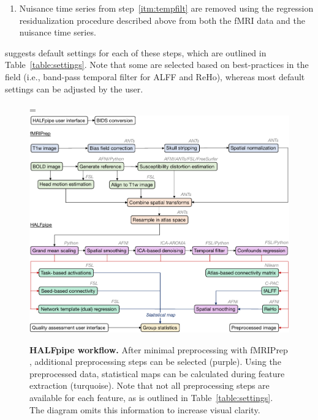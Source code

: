 \begin{enumerate}[leftmargin=*]
\item

Nuisance time series from step~\ref{itm:tempfilt} are removed using the
regression residualization procedure described above from both the fMRI
data and the nuisance time series.

\end{enumerate}

 suggests default settings for each of these steps, which
are outlined in Table~\ref{table:settings}. Note that some are selected based on
best-practices in the field (i.e., band-pass temporal filter for ALFF and
ReHo), whereas most default settings can be adjusted by the user.

\begin{figure}[!tb]
\begin{adjustwidth}{-2.4cm}{}
\hsize=\linewidth%
\includegraphics[width=\linewidth]{fig/workflow-crop}
\caption{\textbf{HALFpipe workflow.} After minimal preprocessing with
fMRIPrep \parencite{10.1038/s41592-018-0235-4}, additional preprocessing
steps can be selected (purple). Using the preprocessed data, statistical
maps can be calculated during feature extraction (turquoise). Note that
not all preprocessing steps are available for each feature, as is outlined
in Table~\ref{table:settings}. The diagram omits this information to 
increase visual clarity.}\label{fig:workflow}
\end{adjustwidth}
\end{figure}

